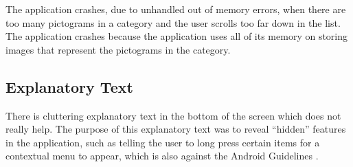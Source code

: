 The application crashes, due to unhandled out of memory errors, when there are too many pictograms in a category and the user scrolls too far down in the list. The application crashes because the application uses all of its memory on storing images that represent the pictograms in the category. 

\subsection{Explanatory Text}

There is cluttering explanatory text in the bottom of the screen which does not really help. The purpose of this explanatory text was to reveal ``hidden'' features in the application, such as telling the user to long press certain items for a contextual menu to appear, which is also against the Android Guidelines \parencite{android_guidelines_longpress}.
